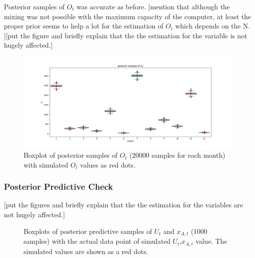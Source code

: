 \documentclass[12pt]{article}
\begin{document}
{Posterior samples of $O_t$ was accurate as before. [mention that although the mixing was not possible with the maximum capacity of the computer, at least the proper prior seems to help a lot for the estimation of $O_t$ which depends on the N. ][put the figure and briefly explain that the the estimation for the variable is not hugely affected.]
\begin{figure}[h]
	\centering
	\includegraphics[width=1\linewidth]{Figures/unknown_N_ot.png}
	\caption{Boxplot of posterior samples of $O_t$ (20000 samples for each month) with simulated $O_t$ values as red dots.}
	\label{pst_ot_unk_n}
\end{figure}

\subsubsection{Posterior Predictive Check}

[put the figures and briefly explain that the the estimation for the variables are not hugely affected.]
\begin{figure}[htb]
	\centering
	\caption[Initial result: box plots of predictive posterior samples of $U_t$ and $x_{A,t}$]{Boxplots of posterior predictive samples of $U_t$ and $x_{A,t}$ (1000 samples) with the actual data point of simulated $U_t$,$x_{A,t}$ value. The simulated values are shown as a red dots.}
	

\end{figure}}
\end{document}
